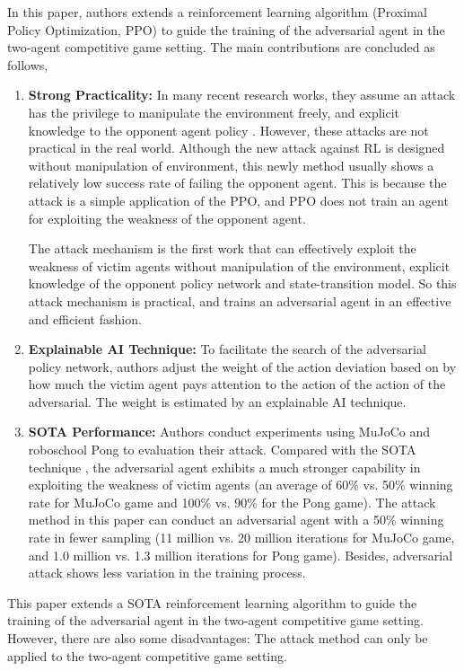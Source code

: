 \documentclass[a4paper]{article}
\begin{document}
In this paper, authors extends a reinforcement learning algorithm (Proximal Policy Optimization, PPO) to guide the training of the adversarial agent in the two-agent competitive game setting.
The main contributions are concluded as follows,
\begin{enumerate}
    \item \textbf{Strong Practicality:} In many recent research works, they assume an attack has the privilege to manipulate the environment freely, and explicit knowledge to the opponent agent policy \cite{xiao2019characterizing}. 
    However, these attacks are not practical in the real world. Although the new attack against RL is designed without manipulation of environment\cite{vinyals2019grandmaster}, 
    this newly method usually shows a relatively low success rate of failing the opponent agent. This is because the attack is a simple application of the PPO, and PPO does not train an agent for exploiting the weakness of the opponent agent.
    
    The attack mechanism is the first work that can effectively exploit the weakness of victim agents without manipulation of the environment, explicit knowledge of the opponent policy network and state-transition model.
    So this attack mechanism is practical, and trains an adversarial agent in an effective and efficient fashion. 
    \item \textbf{Explainable AI Technique:} To facilitate the search of the adversarial policy network, 
    authors adjust the weight of the action deviation based on by how much the victim agent pays attention to the action of the action of the adversarial.
    The weight is estimated by an explainable AI technique.
    \item \textbf{SOTA Performance:} Authors conduct experiments using MuJoCo and roboschool Pong to evaluation their attack. Compared with the SOTA technique \cite{gleave2019adversarial},
    the adversarial agent exhibits a much stronger capability in exploiting the weakness of victim agents (an average of 60\% vs. 50\% winning rate for
    MuJoCo game and 100\% vs. 90\% for the Pong game). The attack method in this paper can conduct an adversarial agent with a 50\% winning rate in fewer sampling (11 million vs. 20
    million iterations for MuJoCo game, and 1.0 million vs. 1.3 million iterations for Pong game).
    Besides, adversarial attack shows less variation in the training process.
\end{enumerate}

This paper extends a SOTA reinforcement learning algorithm to guide the training of the adversarial agent in the two-agent competitive game setting. However, there are also some disadvantages: 
The attack method can only be applied to the two-agent competitive game setting.
\end{document}
